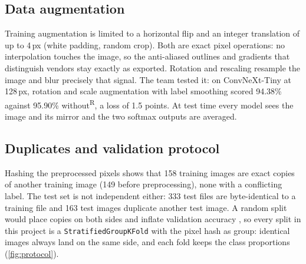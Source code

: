 \documentclass[11pt,a4paper]{article}
\newcommand{\rep}{\textsuperscript{\textcolor{reported}{\sffamily\scriptsize R}}}
\newcommand{\pct}[1]{#1\%}
\begin{document}
\subsection{Data augmentation}
Training augmentation is limited to a horizontal flip and an integer translation of up to 4\,px (white padding, random crop). Both are exact pixel operations: no interpolation touches the image, so the anti-aliased outlines and gradients that distinguish vendors stay exactly as exported. Rotation and rescaling resample the image and blur precisely that signal. The team tested it: on ConvNeXt-Tiny at 128\,px, rotation and scale augmentation with label smoothing \cite{muller2019labelsmoothing} scored \pct{94.38} against \pct{95.90} without\rep, a loss of 1.5 points. At test time every model sees the image and its mirror and the two softmax outputs are averaged.

\subsection{Duplicates and validation protocol}
\label{sec:protocol}
Hashing the preprocessed pixels shows that 158 training images are exact copies of another training image (149 before preprocessing), none with a conflicting label. The test set is not independent either: 333 test files are byte-identical to a training file and 163 test images duplicate another test image. A random split would place copies on both sides and inflate validation accuracy \cite{barz2020cifair}, so every split in this project is a \texttt{StratifiedGroupKFold} \cite{pedregosa2011sklearn} with the pixel hash as group: identical images always land on the same side, and each fold keeps the class proportions (\cref{fig:protocol}).
\end{document}

